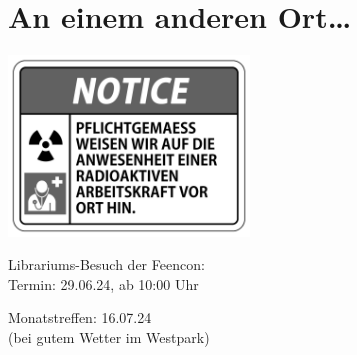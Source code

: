 \documentclass[final]{multiversum}
\begin{document}
\vfill

\section{An einem anderen Ort\ldots}

\includegraphics[width=0.48\textwidth]{src/img/RADIOAKTIVE_ARBEITSKRAFT_greyscale.png}

\vfill

\begin{termine}
\item Librariums-Besuch der Feencon:\\Termin: 29.06.24, ab 10:00 Uhr
\item Monatstreffen: 16.07.24\\(bei gutem Wetter im Westpark)
\end{termine}
\impressum
\end{document}
